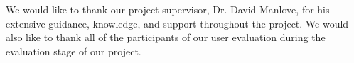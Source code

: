 We would like to thank our project supervisor, Dr. David Manlove, for his 
extensive guidance, knowledge, and support throughout the project. We would also
like to thank all of the participants of our user evaluation during the
evaluation stage of our project.